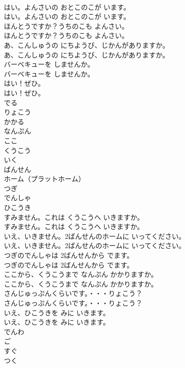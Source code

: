 \documentclass[8pt]{extreport}
\begin{document}
\begin{CJK}{UTF8}{min}
\\	はい。よんさいの おとこのこが います。	
\\	はい。よんさいの おとこのこが います。 
\\	ほんとうですか？うちのこも よんさい。	
\\	ほんとうですか？うちのこも よんさい。 
\\	あ、こんしゅうの にちようび、じかんがありますか。	
\\	あ、こんしゅうの にちようび、じかんがありますか。 
\\	バーベキューを しませんか。	
\\	バーベキューを しませんか。 
\\	はい！ぜひ。	
\\	はい！ぜひ。 
\\	でる
\\	りょこう
\\	かかる
\\	なんぷん
\\	ここ
\\	くうこう
\\	いく
\\	ばんせん
\\	ホーム（プラットホーム）
\\	つぎ
\\	でんしゃ
\\	ひこうき
\\	すみません。これは くうこうへ いきますか。	
\\	すみません。これは くうこうへ いきますか。 
\\	いえ、いきません。2ばんせんのホームに いってください。	
\\	いえ、いきません。2ばんせんのホームに いってください。 
\\	つぎのでんしゃは 2ばんせんから でます。	
\\	つぎのでんしゃは 2ばんせんから でます。 
\\	ここから、くうこうまで なんぷん かかりますか。	
\\	ここから、くうこうまで なんぷん かかりますか。 
\\	さんじゅっぷんくらいです。・・・りょこう？	
\\	さんじゅっぷんくらいです。・・・りょこう？ 
\\	いえ、ひこうきを みに いきます。	
\\	いえ、ひこうきを みに いきます。 
\\	でんわ
\\	ご
\\	すぐ
\\	つく

\end{CJK}
\end{document}
